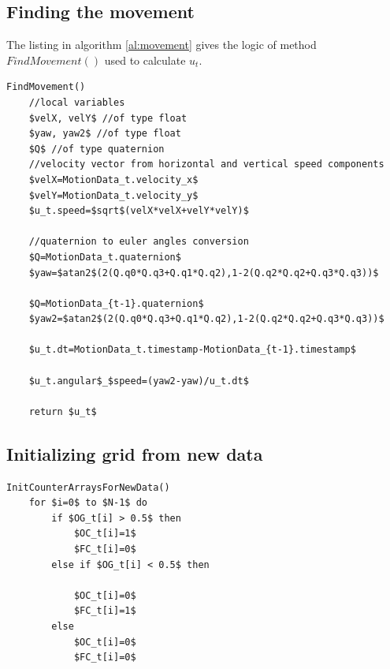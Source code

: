 

\subsection{Finding the movement}
The listing in algorithm \ref{al:movement} gives the logic of method $FindMovement()$ used to calculate $u_t$.
\begin{lstlisting}[label=al:movement,mathescape=true,caption={Find the movement of the vehicle}]
FindMovement()
	//local variables
	$velX, velY$ //of type float
	$yaw, yaw2$ //of type float
	$Q$ //of type quaternion
	//velocity vector from horizontal and vertical speed components
	$velX=MotionData_t.velocity_x$
	$velY=MotionData_t.velocity_y$
	$u_t.speed=$sqrt$(velX*velX+velY*velY)$
	
	//quaternion to euler angles conversion	
	$Q=MotionData_t.quaternion$
	$yaw=$atan2$(2(Q.q0*Q.q3+Q.q1*Q.q2),1-2(Q.q2*Q.q2+Q.q3*Q.q3))$	

	$Q=MotionData_{t-1}.quaternion$
	$yaw2=$atan2$(2(Q.q0*Q.q3+Q.q1*Q.q2),1-2(Q.q2*Q.q2+Q.q3*Q.q3))$	
	
	$u_t.dt=MotionData_t.timestamp-MotionData_{t-1}.timestamp$
	
	$u_t.angular$_$speed=(yaw2-yaw)/u_t.dt$
	
	return $u_t$
\end{lstlisting}


\subsection{Initializing grid from new data}

\begin{lstlisting}[label=al:initializeGrid,mathescape=true,caption={Initialization of the grid}]
InitCounterArraysForNewData()
	for $i=0$ to $N-1$ do
		if $OG_t[i] > 0.5$ then 
			$OC_t[i]=1$
			$FC_t[i]=0$
		else if $OG_t[i] < 0.5$ then
		
			$OC_t[i]=0$
			$FC_t[i]=1$
		else
			$OC_t[i]=0$
			$FC_t[i]=0$
\end{lstlisting}

